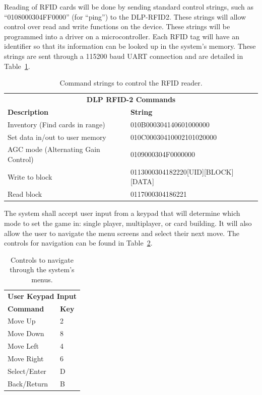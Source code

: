 \documentclass[12pt]{article} %
\begin{document}
Reading of RFID cards will be done by sending standard control strings, such as “0108000304FF0000” (for “ping”) to the DLP-RFID2.  These strings will allow control over read and write functions on the device.  These strings will be programmed into a driver on a microcontroller.  Each RFID tag will have an identifier so that its information can be looked up in the system’s memory.   These strings are sent through a 115200 baud UART connection and are detailed in Table~\ref{Tab:DLP RFID-2 input commands}.

\begin{table}[h]
	\begin{tabular}{ll}
		\multicolumn{2}{c}{\textbf{DLP RFID-2 Commands}}                                     \\
		\textbf{Description}                & \textbf{String}                                \\
		Inventory (Find cards in range)     & 010B000304140601000000                         \\
		Set data in/out to user memory      & 010C00030410002101020000                       \\
		AGC mode (Alternating Gain Control) & 0109000304F0000000                             \\
		Write to block                      & 0113000304182220{[}UID{]}{[}BLOCK{]}{[}DATA{]} \\
		Read block                          & 0117000304186221                              
	\end{tabular}
	\caption{Command strings to control the RFID reader.}
	\label{Tab:DLP RFID-2 input commands}
\end{table}

The system shall accept user input from a keypad that will determine which mode to set the game in: single player, multiplayer, or card building. It will also allow the user to navigate the menu screens and select their next move. The controls for navigation can be found in Table~\ref{Tab:controlsTable}.

\begin{table}[h]
	\begin{tabular}{ll}
		\multicolumn{2}{c}{\textbf{User Keypad Input}} \\
		\textbf{Command}         & \textbf{Key}        \\
		Move Up                  & 2                   \\
		Move Down                & 8                   \\
		Move Left                & 4                   \\
		Move Right               & 6                   \\
		Select/Enter             & D                   \\
		Back/Return              & B                  
	\end{tabular}
	\caption{Controls to navigate through the system's menus.}
	\label{Tab:controlsTable}
\end{table}
\end{document}
